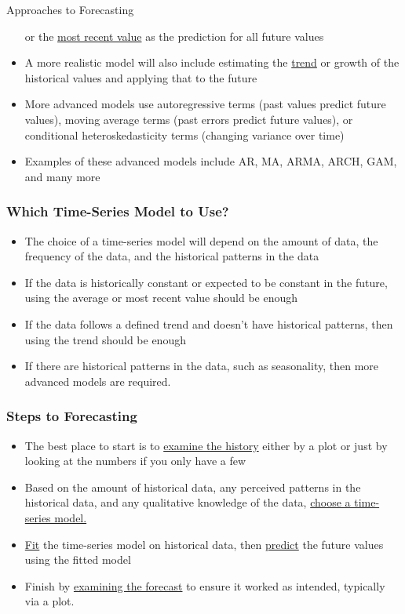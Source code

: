 \documentclass[handout, 11pt]{beamer}
\begin{document}
\begin{section}{Approaches to Forecasting}
\begin{frame}
\begin{itemize}
or the
\underline{most recent value}
as the prediction for all future values
\vfill
\item A more realistic model will also include estimating the
\underline{trend}
or growth of the historical values and applying that to the future
\vfill
\item More advanced models use autoregressive terms (past values predict future values), moving average terms (past errors predict future values), or conditional heteroskedasticity terms (changing variance over time)
\vfill
\item Examples of these advanced models include AR, MA, ARMA, ARCH, GAM, and many more
\end{itemize}
\end{frame}
\begin{frame}
\frametitle{Which Time-Series Model to Use?}
\begin{itemize}
\item The choice of a time-series model will depend on the amount of data, the frequency of the data, and the historical patterns in the data
\vfill
\item If the data is historically constant or expected to be constant in the future, using the average or most recent value should be enough
\vfill
\item If the data follows a defined trend and doesn't have historical patterns, then using the trend should be enough
\vfill
\item If there are historical patterns in the data, such as seasonality, then more advanced models are required.
\end{itemize}
\end{frame}
\begin{frame}
\frametitle{Steps to Forecasting}
\begin{itemize}
\item The best place to start is to
\underline{examine the history}
either by a plot
or just by looking at the numbers if you only have a few
\vfill
\item Based on the amount of historical data, any perceived patterns in the historical data, and any qualitative knowledge of the data,
\underline{choose a time-series model.}
\vfill
\item \underline{Fit}
the time-series model on historical data, then
\underline{predict}
the future values using the fitted model
\vfill
\item Finish by
\underline{examining the forecast}
to ensure it worked as intended, 
typically via a plot.

\end{itemize}
\end{frame}
\end{section}
\end{document}
